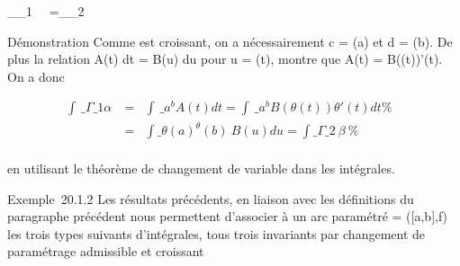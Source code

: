 \documentclass[]{article}
\begin{document}
\int  \_\Gamma\_1~\alpha~
=\int  \_\Gamma\_2~\beta~

Démonstration Comme \theta est croissant, on a nécessairement c = \theta(a) et d =
\theta(b). De plus la relation A(t) dt = B(u) du pour u = \theta(t), montre que
A(t) = B(\theta(t))\theta'(t). On a donc

\begin{align*} \int ~
\_\Gamma\_1\alpha~& =& \int ~
\_a^bA(t) dt =\int ~
\_a^bB(\theta(t))\theta'(t) dt\%& \\
& =& \int  \_\theta(a)^\theta(b)~B(u) du
=\int  \_\Gamma\_2~\beta~ \%&
\\ \end{align*}

en utilisant le théorème de changement de variable dans les intégrales.

Exemple~20.1.2 Les résultats précédents, en liaison avec les définitions
du paragraphe précédent nous permettent d'associer à un arc paramétré \Gamma
= ({[}a,b{]},f) les trois types suivants d'intégrales, tous trois
invariants par changement de paramétrage admissible et croissant
\end{document}
